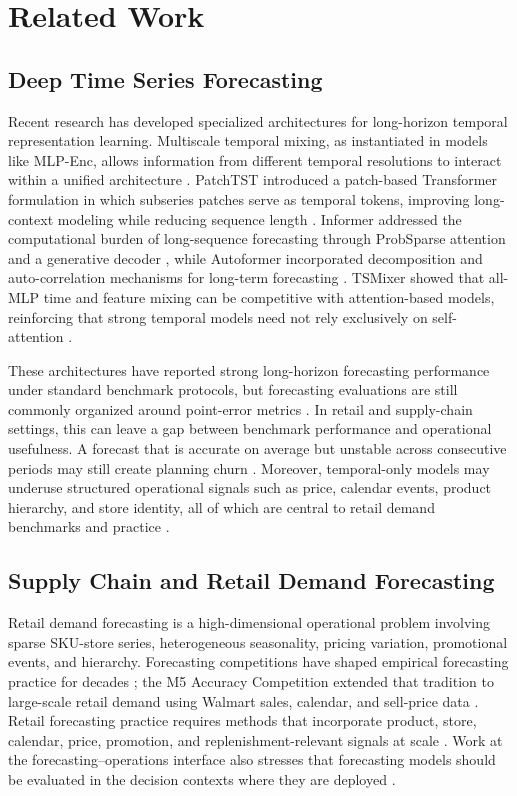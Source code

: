 \documentclass[10pt,conference]{IEEEtran}
\begin{document}
\section{Related Work}
\subsection{Deep Time Series Forecasting}
Recent research has developed specialized architectures for long-horizon temporal representation learning. Multiscale temporal mixing, as instantiated in models like MLP-Enc, allows information from different temporal resolutions to interact within a unified architecture \cite{wang2024timemixer}. PatchTST introduced a patch-based Transformer formulation in which subseries patches serve as temporal tokens, improving long-context modeling while reducing sequence length \cite{nie2023patchtst}. Informer addressed the computational burden of long-sequence forecasting through ProbSparse attention and a generative decoder \cite{zhou2021informer}, while Autoformer incorporated decomposition and auto-correlation mechanisms for long-term forecasting \cite{wu2021autoformer}. TSMixer showed that all-MLP time and feature mixing can be competitive with attention-based models, reinforcing that strong temporal models need not rely exclusively on self-attention \cite{chen2023tsmixer}.

These architectures have reported strong long-horizon forecasting performance under standard benchmark protocols, but forecasting evaluations are still commonly organized around point-error metrics \cite{petropoulos2022forecasting,godahewa2025forecastStability}. In retail and supply-chain settings, this can leave a gap between benchmark performance and operational usefulness. A forecast that is accurate on average but unstable across consecutive periods may still create planning churn \cite{lee1997bullwhip,chen2000bullwhip,godahewa2025forecastStability}. Moreover, temporal-only models may underuse structured operational signals such as price, calendar events, product hierarchy, and store identity, all of which are central to retail demand benchmarks and practice \cite{makridakis2022m5,fildes2022retail}.

\subsection{Supply Chain and Retail Demand Forecasting}
Retail demand forecasting is a high-dimensional operational problem involving sparse SKU-store series, heterogeneous seasonality, pricing variation, promotional events, and hierarchy. Forecasting competitions have shaped empirical forecasting practice for decades \cite{makridakis2000m3}; the M5 Accuracy Competition extended that tradition to large-scale retail demand using Walmart sales, calendar, and sell-price data \cite{makridakis2022m5}. Retail forecasting practice requires methods that incorporate product, store, calendar, price, promotion, and replenishment-relevant signals at scale \cite{fildes2022retail}. Work at the forecasting--operations interface also stresses that forecasting models should be evaluated in the decision contexts where they are deployed \cite{fildes2008orReview,petropoulos2022forecasting}.
\end{document}
